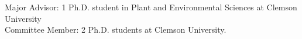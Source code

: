 

\cvsummarytext
{Major Advisor: 1 Ph.D. student in Plant and Environmental Sciences at Clemson University \\
Committee Member: 2 Ph.D. students at Clemson University.}
{}

